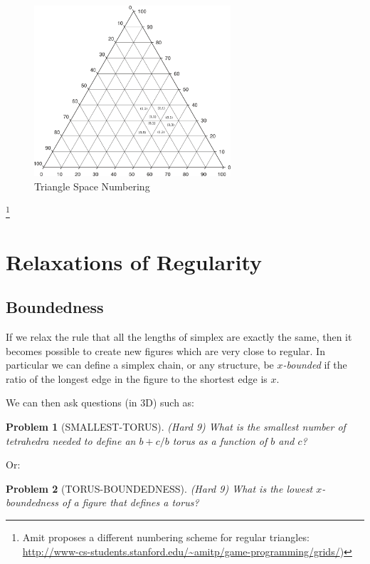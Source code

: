 \documentclass[11pt]{article}
\newtheorem{problem}{Problem}
\begin{document}
\begin{figure}
     \centering
     \includegraphics[width=0.65\textwidth]{figures/Triangle_Plot_-_Major_grid_lines.png}
     \caption{Triangle Space Numbering}
  \label{fig:equitetrabeam}
\end{figure}

\footnote{ Amit proposes a different numbering scheme for regular triangles:
  \url{http://www-cs-students.stanford.edu/~amitp/game-programming/grids/})
}


\section{Relaxations of Regularity}
\subsection{Boundedness}

If we relax the rule that all the lengths of simplex are exactly the same, then it becomes possible to create new figures which are
very close to regular. In particular we can define a simplex chain, or any structure, be {\em $x$-bounded} if the ratio of the longest edge
in the figure to the shortest edge is $x$.

We can then ask questions (in 3D) such as:

\begin{problem}[SMALLEST-TORUS]
(Hard 9)  What is the smallest number of tetrahedra needed to define an $b+c/b$ torus as a function of $b$ and $c$?
  \end{problem}

Or:

\begin{problem}[TORUS-BOUNDEDNESS]
(Hard 9)  What is the lowest $x$-boundedness of a figure that defines a torus?
  \end{problem}
\end{document}
